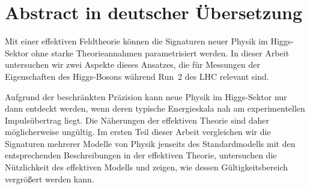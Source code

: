 


\chapter*{Abstract in deutscher \"{U}bersetzung}





Mit einer effektiven Feldtheorie k\"onnen die Signaturen neuer Physik
im Higgs-Sektor ohne starke Theorieannahmen parametrisiert werden. In
dieser Arbeit untersuchen wir zwei Aspekte dieses Ansatzes, die f\"ur
Messungen der Eigenschaften des Higgs-Bosons w\"ahrend Run~2 des LHC
relevant sind.

Aufgrund der beschr\"ankten Pr\"azision kann neue Physik im
Higgs-Sektor nur dann entdeckt werden, wenn deren typische
Energieskala nah am experimentellen Impuls\"ubertrag liegt. Die
N\"aherungen der effektiven Theorie sind daher m\"oglicherweise
ung\"ultig. Im ersten Teil dieser Arbeit vergleichen wir die
Signaturen mehrerer Modelle von Physik jenseits des Standardmodells
mit den entsprechenden Beschreibungen in der effektiven Theorie,
untersuchen die N\"utzlichkeit des effektiven Modells und
zeigen, wie dessen G\"ultigkeitsbereich vergr\"o\ss{}ert werden
kann.

